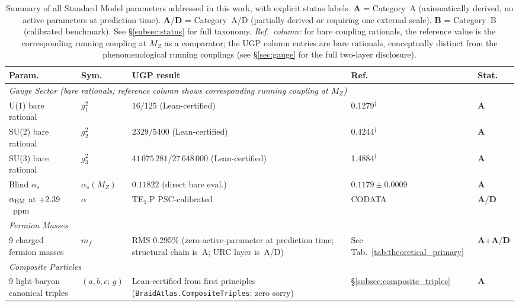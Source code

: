 \documentclass[11pt]{article}
\theoremstyle{remark}
\begin{document}
\begin{table}[p]
\centering
\caption{Summary of all Standard Model parameters addressed in this work, with explicit status labels. \textbf{A} = Category~A (axiomatically derived, no active parameters at prediction time). \textbf{A}/\textbf{D} = Category~A/D (partially derived or requiring one external scale). \textbf{B} = Category~B (calibrated benchmark). See \S\ref{subsec:status} for full taxonomy. \emph{Ref.\ column:} for bare coupling rationals, the reference value is the corresponding running coupling at $M_Z$ as a comparator; the UGP column entries are bare rationals, conceptually distinct from the phenomenological running couplings (see \S\ref{sec:gauge} for the full two-layer disclosure).}
\label{tab:final_summary}
\renewcommand{\arraystretch}{1.12}
\scriptsize
\setlength{\tabcolsep}{2.5pt}
\begin{tabular}{@{}p{2.9cm} l p{4.4cm} p{2.1cm} l@{}}
\toprule
\textbf{Param.} & \textbf{Sym.} & \textbf{UGP result} & \textbf{Ref.} & \textbf{Stat.} \\
\midrule
\multicolumn{5}{l}{\textit{Gauge Sector (bare rationals; reference column shows corresponding running coupling at $M_Z$)}} \\
U(1) bare rational & $g_1^2$ & $16/125$ (Lean-certified) & 0.1279$^\dagger$ & \textbf{A} \\
SU(2) bare rational & $g_2^2$ & $2329/5400$ (Lean-certified) & 0.4244$^\dagger$ & \textbf{A} \\
SU(3) bare rational & $g_3^2$ & $41\,075\,281/27\,648\,000$ (Lean-certified) & 1.4884$^\dagger$ & \textbf{A} \\
Blind $\alpha_s$ & $\alpha_s(M_Z)$ & $0.11822$ (direct bare eval.) & $0.1179\pm0.0009$ & \textbf{A} \\
$\alpha_{\rm EM}$ at $+2.39$~ppm & $\alpha$ & TE$_1$.P PSC-calibrated & CODATA & \textbf{A}/\textbf{D} \\
\midrule
\multicolumn{5}{l}{\textit{Fermion Masses}} \\
9 charged fermion masses & $m_f$ & RMS 0.295\% (zero-active-parameter at prediction time; structural chain is~A; URC layer is~A/D) & See Tab.~\ref{tab:theoretical_primary} & \mbox{\textbf{A}+\textbf{A}/\textbf{D}} \\
\midrule
\multicolumn{5}{l}{\textit{Composite Particles}} \\
9 light-baryon canonical triples & $(a,b,c;\,g)$ & Lean-certified from first principles (\texttt{BraidAtlas.CompositeTriples}; zero sorry) & \S\ref{subsec:composite_triples} & \textbf{A} \\

\end{tabular}
\end{table}
\end{document}

